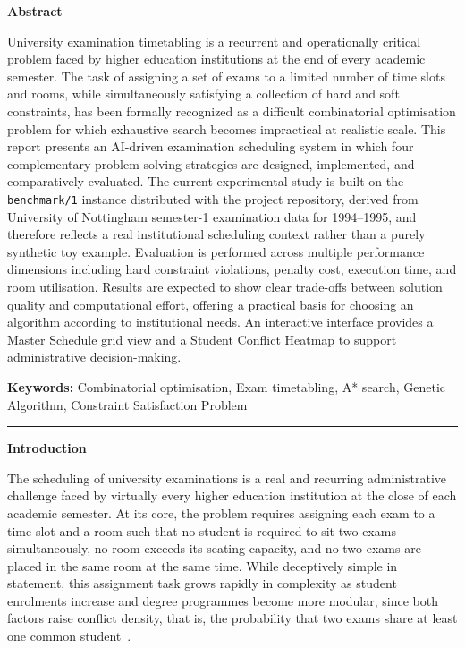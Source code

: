 {}

{\large\bfseries Abstract}
\vspace{2pt}
\titlerule
\vspace{6pt}

University examination timetabling is a recurrent and operationally
critical problem faced by higher education institutions at the end of
every academic semester. The task of assigning a set of exams to a
limited number of time slots and rooms, while simultaneously satisfying
a collection of hard and soft constraints, has been formally recognized
as a difficult combinatorial optimisation problem for which exhaustive
search becomes impractical at realistic scale. This report presents an
AI-driven examination scheduling system in which four complementary
problem-solving strategies are designed, implemented, and comparatively
evaluated. The current experimental study is built on the
\texttt{benchmark/1} instance distributed with the project repository,
derived from University of Nottingham semester-1 examination data for
1994--1995, and therefore reflects a real institutional scheduling
context rather than a purely synthetic toy example. Evaluation is
performed across multiple performance dimensions including hard
constraint violations, penalty cost, execution time, and room
utilisation. Results are expected to show clear trade-offs between
solution quality and computational effort, offering a practical basis
for choosing an algorithm according to institutional needs. An
interactive interface provides a Master Schedule grid view and a Student
Conflict Heatmap to support administrative decision-making.

\vspace{4pt}
\noindent\textbf{Keywords:} Combinatorial optimisation, Exam timetabling, A* search, Genetic Algorithm, Constraint Satisfaction Problem

\vspace{5pt}
\noindent\rule{\linewidth}{0.4pt}
\vspace{4pt}

{}

{\large\bfseries Introduction}
\vspace{2pt}
\titlerule
\vspace{6pt}

The scheduling of university examinations is a real and recurring
administrative challenge faced by virtually every higher education
institution at the close of each academic semester. At its core, the
problem requires assigning each exam to a time slot and a room such that
no student is required to sit two exams simultaneously, no room exceeds
its seating capacity, and no two exams are placed in the same room at
the same time. While deceptively simple in statement, this assignment
task grows rapidly in complexity as student enrolments increase and
degree programmes become more modular, since both factors raise conflict
density, that is, the probability that two exams share at least one
common student~\parencite{carter1996,qu2009}.

